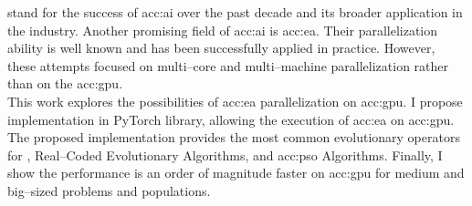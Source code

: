 \documentclass[12pt]{report}
\begin{document}
 stand for the success of \acrlong*{acc:ai} over the past decade and its broader application in the industry. Another promising field of \acrlong*{acc:ai} is \acrlong*{acc:ea}. Their parallelization ability is well known and has been successfully applied in practice. However, these attempts focused on multi--core and multi--machine parallelization rather than on the \acrshort*{acc:gpu}.\\
This work explores the possibilities of \acrlong*{acc:ea} parallelization on \acrshort*{acc:gpu}. I propose implementation in PyTorch library, allowing the execution of \acrshort*{acc:ea} on \acrshort*{acc:gpu}. The proposed implementation provides the most common evolutionary operators for , Real--Coded Evolutionary Algorithms, and \acrlong*{acc:pso} Algorithms. Finally, I show the performance is an order of magnitude faster on \acrshort*{acc:gpu} for medium and big--sized problems and populations.
\end{document}
